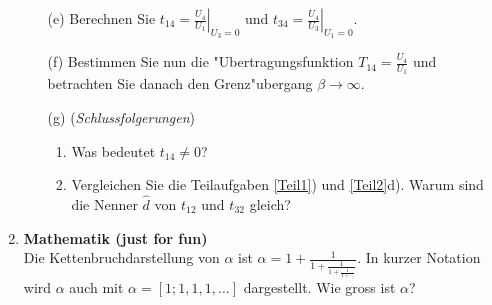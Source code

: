\begin{enumerate}
\begin{enumerate}
  \item[(e)]
    Berechnen Sie $t_{14}=\left.\frac{U_4}{U_1}\right|_{U_3=0}$ und $t_{34}=\left.\frac{U_4}{U_3}\right|_{U_1=0}$.

  \item[(f)]
    Bestimmen Sie nun die "Ubertragungsfunktion $T_{14} = \frac{U_4}{U_1}$ und betrachten Sie danach den Grenz"ubergang $\beta \rightarrow \infty$.

  \item[(g)]
    (\emph{Schlussfolgerungen})
    \begin{enumerate}
      \item
        Was bedeutet $t_{14} \neq 0$?
      \item
        Vergleichen Sie die Teilaufgaben \ref{Teil1}) und \ref{Teil2}d). Warum sind die Nenner $\hat d$ von $t_{12}$ und $t_{32}$ gleich?
    \end{enumerate}
\end{enumerate}

\item {\bf Mathematik (just for fun)}\\ Die Kettenbruchdarstellung von $\alpha$ ist
$\alpha=1+\frac{1}{1+\frac{1}{1+\frac{1}{1+\ldots}}}$. In kurzer Notation wird $\alpha$ auch mit $\alpha=[1;1,1,1,\ldots]$ dargestellt. Wie gross ist $\alpha$?


\end{enumerate}
